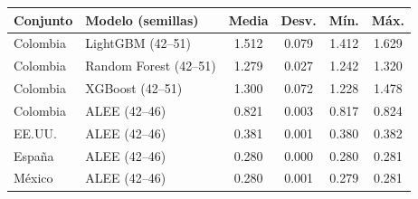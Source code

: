 \begin{tabular}{llcccc}
\toprule
Conjunto & Modelo (semillas) & Media & Desv. & Mín. & Máx. \\
\midrule
Colombia & LightGBM (42--51) & 1.512 & 0.079 & 1.412 & 1.629 \\
Colombia & Random Forest (42--51) & 1.279 & 0.027 & 1.242 & 1.320 \\
Colombia & XGBoost (42--51) & 1.300 & 0.072 & 1.228 & 1.478 \\
Colombia & ALEE (42--46) & 0.821 & 0.003 & 0.817 & 0.824 \\
EE.UU. & ALEE (42--46) & 0.381 & 0.001 & 0.380 & 0.382 \\
España & ALEE (42--46) & 0.280 & 0.000 & 0.280 & 0.281 \\
México & ALEE (42--46) & 0.280 & 0.001 & 0.279 & 0.281 \\
\bottomrule
\end{tabular}